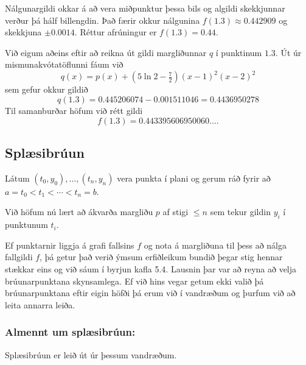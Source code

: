 \documentclass[icelandic,a4paper,12pt]{article}
\begin{document}
\pause
Nálgunargildi okkar á að vera miðpunktur þessa bils og 
algildi skekkjunnar verður þá hálf billengdin.
Það færir okkur nálgunina
$f(1.3) \approx 0.442909$ og skekkjuna $\pm 0.0014$.
Réttur afrúningur er $f(1.3)=0.44$.


Við eigum aðeins eftir að reikna út gildi 
margliðunnar $q$ í punktinum $1.3$.  Út úr mismunakvótatöflunni
fáum við
$$
q(x)=p(x)+(5\ln 2-\tfrac 72)(x-1)^2(x-2)^2
$$
sem gefur okkur gildið
$$
q(1.3)=0.445206074-0.001511046=0.4436950278
$$
Til samanburðar höfum við rétt gildi
$$f(1.3)=0.443395606950060\ldots.
$$



\subsection{Splæsibrúun} 
Látum $(t_0,y_0),\dots,(t_n,y_n)$ vera punkta í plani og gerum ráð
fyrir að $a=t_0<t_1<\cdots<t_n=b$. 

\pause
\smallskip
Við höfum nú lært að ákvarða
margliðu $p$ af stigi $\leq n$ sem tekur gildin $y_i$ í punktunum
$t_i$.  

\pause
\smallskip
Ef punktarnir liggja á grafi fallsins $f$ og nota á margliðuna
til þess að nálga fallgildi $f$, þá getur það verið ýmsum erfiðleikum
bundið þegar stig hennar stækkar eins og við sáum í byrjun kafla 5.4. 
Lausnin þar var að reyna að velja brúunarpunktana skynsamlega. 
Ef við hins vegar getum ekki valið þá brúunarpunktana eftir eigin höfði
þá erum við í vandræðum og þurfum við að leita annarra leiða. 



\subsubsection{Almennt um splæsibrúun:} 
Splæsibrúun er leið út úr þessum vandræðum. 
\end{document}
